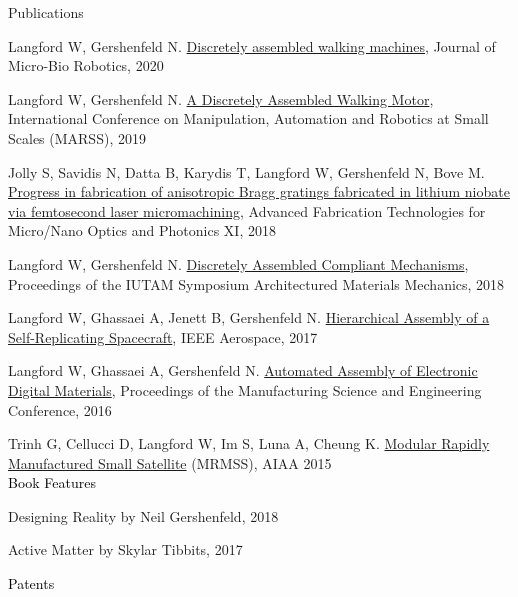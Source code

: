 \documentclass{resume} %
\begin{document}
\begin{rSection}{Publications}

Langford W, Gershenfeld N. \href{https://dspace.mit.edu/bitstream/handle/1721.1/131389/12213_2020_128_ReferencePDF.pdf?sequence=1&isAllowed=y}{Discretely assembled walking machines}, Journal of Micro-Bio Robotics, 2020

Langford W, Gershenfeld N. \href{http://www.cba.mit.edu/docs/papers/19.07.marss.pdf}{A Discretely Assembled Walking Motor}, International Conference on Manipulation, Automation and Robotics at Small Scales (MARSS), 2019

Jolly S, Savidis N, Datta B, Karydis T, Langford W, Gershenfeld N, Bove M. \href{https://dspace.mit.edu/bitstream/handle/1721.1/137894/105440D.pdf?sequence=2&isAllowed=y}{Progress in fabrication of anisotropic Bragg gratings fabricated in lithium niobate via femtosecond laser micromachining}, Advanced Fabrication Technologies for Micro/Nano Optics and Photonics XI, 2018

Langford W, Gershenfeld N. \href{https://docs.lib.purdue.edu/iutam/presentations/abstracts/45}{Discretely Assembled Compliant Mechanisms}, Proceedings of the IUTAM Symposium Architectured Materials Mechanics, 2018

Langford W, Ghassaei A, Jenett B, Gershenfeld N. \href{http://cba.mit.edu/docs/papers/17.04.11.SelfAssemSpacecraft.pdf}{Hierarchical Assembly of a Self-Replicating Spacecraft}, IEEE Aerospace, 2017

Langford W, Ghassaei A, Gershenfeld N. \href{http://cba.mit.edu/docs/papers/16.07.msec.stapler.pdf}{Automated Assembly of Electronic Digital Materials}, Proceedings of the Manufacturing Science and Engineering Conference, 2016

Trinh G, Cellucci D, Langford W, Im S, Luna A, Cheung K. \href{https://doi.org/10.2514/6.2015-0941}{Modular Rapidly Manufactured Small Satellite} (MRMSS), AIAA 2015
\sectionskip
\\\textcolor{black}{Book Features}

\begingroup\leftskip=0.7cm
Designing Reality by Neil Gershenfeld, 2018

Active Matter by Skylar Tibbits, 2017

\endgroup

\textcolor{black}{Patents}


\end{rSection}
\end{document}
